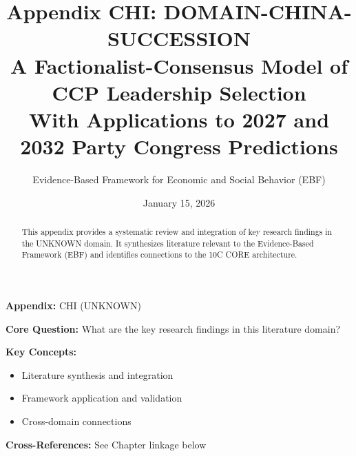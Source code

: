 \documentclass[11pt]{article}
\title{\textbf{Appendix CHI: DOMAIN-CHINA-SUCCESSION} \\ A Factionalist-Consensus Model of CCP Leadership Selection \\ With Applications to 2027 and 2032 Party Congress Predictions}
\author{Evidence-Based Framework for Economic and Social Behavior (EBF)}
\date{January 15, 2026}
\begin{document}
\maketitle


\begin{tcolorbox}[colback=blue!5!white, colframe=blue!75!black,
    title=Quick Reference: Appendix CHI]
\textbf{Appendix:} CHI (UNKNOWN)

\textbf{Core Question:} What are the key research findings in this literature domain?

\textbf{Key Concepts:}
\begin{itemize}[nosep]
\item Literature synthesis and integration
\item Framework application and validation
\item Cross-domain connections
\end{itemize}

\textbf{Cross-References:} See Chapter linkage below
\end{tcolorbox}


\begin{abstract}
This appendix provides a systematic review and integration of key research findings
in the UNKNOWN domain. It synthesizes literature relevant to the Evidence-Based
Framework (EBF) and identifies connections to the 10C CORE architecture.
\end{abstract}
\end{document}
